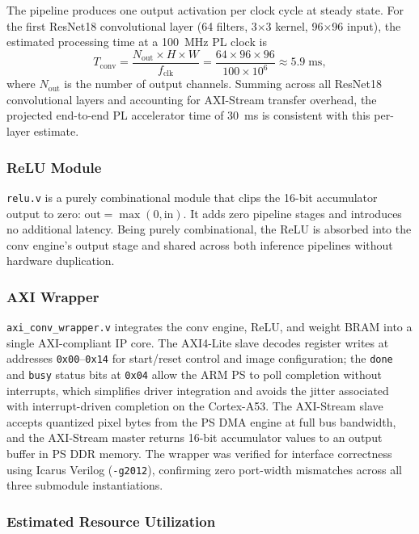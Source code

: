 \documentclass[conference]{IEEEtran}
\begin{document}
The pipeline produces one output activation per clock cycle at steady state. For the first ResNet18 convolutional layer (64 filters, 3$\times$3 kernel, 96$\times$96 input), the estimated processing time at a 100~MHz PL clock is
\begin{equation}
T_\text{conv} = \frac{N_\text{out} \times H \times W}{f_\text{clk}} = \frac{64 \times 96 \times 96}{100 \times 10^6} \approx 5.9\;\text{ms},
\end{equation}
where $N_\text{out}$ is the number of output channels. Summing across all ResNet18 convolutional layers and accounting for AXI-Stream transfer overhead, the projected end-to-end PL accelerator time of 30~ms is consistent with this per-layer estimate.

\subsubsection{ReLU Module}

\texttt{relu.v} is a purely combinational module that clips the 16-bit accumulator output to zero: $\text{out} = \max(0, \text{in})$. It adds zero pipeline stages and introduces no additional latency. Being purely combinational, the ReLU is absorbed into the conv engine's output stage and shared across both inference pipelines without hardware duplication.

\subsubsection{AXI Wrapper}

\texttt{axi\_conv\_wrapper.v} integrates the conv engine, ReLU, and weight BRAM into a single AXI-compliant IP core. The AXI4-Lite slave decodes register writes at addresses \texttt{0x00}--\texttt{0x14} for start/reset control and image configuration; the \texttt{done} and \texttt{busy} status bits at \texttt{0x04} allow the ARM PS to poll completion without interrupts, which simplifies driver integration and avoids the jitter associated with interrupt-driven completion on the Cortex-A53. The AXI-Stream slave accepts quantized pixel bytes from the PS DMA engine at full bus bandwidth, and the AXI-Stream master returns 16-bit accumulator values to an output buffer in PS DDR memory. The wrapper was verified for interface correctness using Icarus Verilog (\texttt{-g2012}), confirming zero port-width mismatches across all three submodule instantiations.

\subsubsection{Estimated Resource Utilization}
\end{document}
